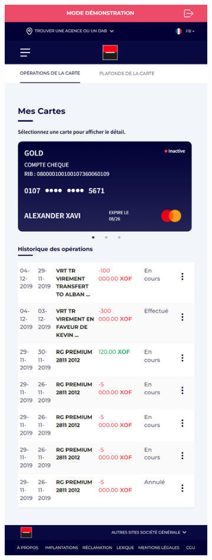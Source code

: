 \begin{figure}[!ht]
    \centering
    \begin{subfigure}[b]{0.49\textwidth}
        \centering
        \includegraphics[width=\textwidth]{images/screens/cartes/mob.png}

\end{subfigure}
\end{figure}
